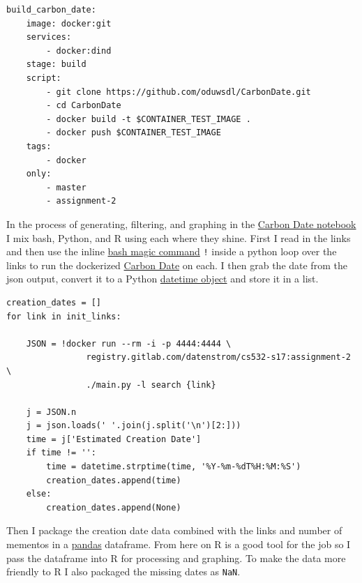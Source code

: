 \documentclass[12pt, a4paper]{article}
\newcommand{\code}[1]{\texttt{#1}}
\begin{document}
\begin{minipage}{\linewidth} %
\vspace{2em}
\begin{verbatim}
build_carbon_date:
    image: docker:git
    services:
        - docker:dind
    stage: build
    script:
        - git clone https://github.com/oduwsdl/CarbonDate.git
        - cd CarbonDate
        - docker build -t $CONTAINER_TEST_IMAGE .
        - docker push $CONTAINER_TEST_IMAGE
    tags:
        - docker
    only:
        - master
        - assignment-2
\end{verbatim}
\vspace{2em}
\end{minipage}

\newpage
In the process of generating, filtering, and graphing in the
\href{https://gitlab.com/datenstrom/cs532-s17}{Carbon Date notebook}
I mix bash, Python, and R using each where they shine.
First I read in the links and then use the inline 
\href{http://ipython.readthedocs.io/en/stable/interactive/magics.html?highlight=magic#cell-magics}{bash magic command}
\code{!} inside a python loop over the links to run the dockerized 
\href{https://github.com/oduwsdl/CarbonDate}{Carbon Date} on each.
I then grab the date from the json output, convert it to a Python
\href{https://docs.python.org/3.6/library/datetime.html}{datetime object}
and store it in a list.

\begin{minipage}{\linewidth} %
\vspace{2em}
\begin{verbatim}
creation_dates = []
for link in init_links:
    
    JSON = !docker run --rm -i -p 4444:4444 \
                registry.gitlab.com/datenstrom/cs532-s17:assignment-2 \
                ./main.py -l search {link}
    
    j = JSON.n
    j = json.loads(' '.join(j.split('\n')[2:]))
    time = j['Estimated Creation Date']
    if time != '':
        time = datetime.strptime(time, '%Y-%m-%dT%H:%M:%S')
        creation_dates.append(time)
    else:
        creation_dates.append(None)
\end{verbatim}
\vspace{2em}
\end{minipage}

Then I package the creation date data combined with the links and number
of mementos in a \href{http://pandas.pydata.org/}{pandas} dataframe.
From here on R is a good tool for the job so I pass the dataframe into
R for processing and graphing. To make the data more friendly to R
I also packaged the missing dates as \code{NaN}.
\end{document}
